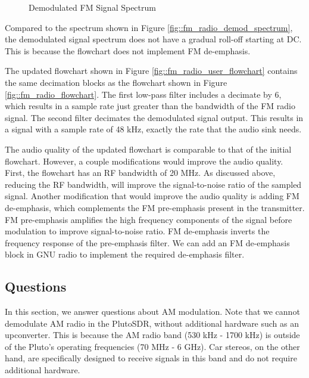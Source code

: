 \documentclass{article}
\begin{document}
\begin{figure}[H]
	\centerline{}
	\caption{Demodulated FM Signal Spectrum}
	\label{fig::fm_radio_user_demod_spectrum}
\end{figure}

\noindent Compared to the spectrum shown in Figure \ref{fig::fm_radio_demod_spectrum}, the demodulated signal spectrum does not have a gradual roll-off starting at DC. This is because the flowchart does not implement FM de-emphasis.

The updated flowchart shown in Figure \ref{fig::fm_radio_user_flowchart} contains the same decimation blocks as the flowchart shown in Figure \ref{fig::fm_radio_flowchart}. The first low-pass filter includes a decimate by 6, which results in a sample rate just greater than the bandwidth of the FM radio signal. The second filter decimates the demodulated signal output. This results in a signal with a sample rate of 48 kHz, exactly the rate that the audio sink needs.

The audio quality of the updated flowchart is comparable to that of the initial flowchart. However, a couple modifications would improve the audio quality. First, the flowchart has an RF bandwidth of 20 MHz. As discussed above, reducing the RF bandwidth, will improve the signal-to-noise ratio of the sampled signal. Another modification that would improve the audio quality is adding FM de-emphasis, which complements the FM pre-emphasis present in the transmitter. FM pre-emphasis amplifies the high frequency components of the signal before modulation to improve signal-to-noise ratio. FM de-emphasis inverts the frequency response of the pre-emphasis filter. We can add an FM de-emphasis block in GNU radio to implement the required de-emphasis filter.

\subsection{Questions}

In this section, we answer questions about AM modulation. Note that we cannot demodulate AM radio in the PlutoSDR, without additional hardware such as an upconverter. This is because the AM radio band (530 kHz - 1700 kHz) is outside of the Pluto's operating frequencies (70 MHz - 6 GHz). Car stereos, on the other hand, are specifically designed to receive signals in this band and do not require additional hardware.
\end{document}
